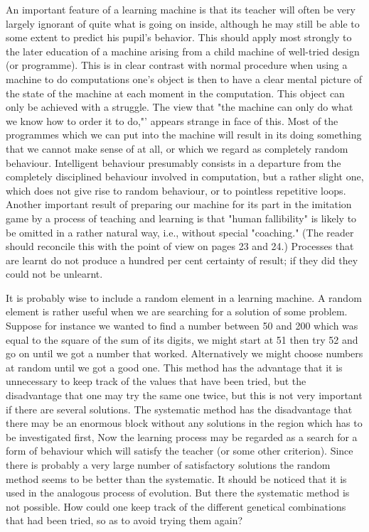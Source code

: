 \documentclass{article}
\begin{document}
An important feature of a learning machine is that its teacher will often be very largely ignorant of quite what is going on inside, although he may still be able to some extent to predict his pupil's behavior. This should apply most strongly to the later education of a machine arising from a child machine of well-tried design (or programme). This is in clear contrast with normal procedure when using a machine to do computations one's object is then to have a clear mental picture of the state of the machine at each moment in the computation. This object can only be achieved with a struggle. The view that "the machine can only do what we know how to order it to do,"' appears strange in face of this. Most of the programmes which we can put into the machine will result in its doing something that we cannot make sense of at all, or which we regard as completely random behaviour. Intelligent behaviour presumably consists in a departure from the completely disciplined behaviour involved in computation, but a rather slight one, which does not give rise to random behaviour, or to pointless repetitive loops. Another important result of preparing our machine for its part in the imitation game by a process of teaching and learning is that "human fallibility" is likely to be omitted in a rather natural way, i.e., without special "coaching." (The reader should reconcile this with the point of view on pages 23 and 24.) Processes that are learnt do not produce a hundred per cent certainty of result; if they did they could not be unlearnt.

It is probably wise to include a random element in a learning machine. A random element is rather useful when we are searching for a solution of some problem. Suppose for instance we wanted to find a number between 50 and 200 which was equal to the square of the sum of its digits, we might start at 51 then try 52 and go on until we got a number that worked. Alternatively we might choose numbers at random until we got a good one. This method has the advantage that it is unnecessary to keep track of the values that have been tried, but the disadvantage that one may try the same one twice, but this is not very important if there are several solutions. The systematic method has the disadvantage that there may be an enormous block without any solutions in the region which has to be investigated first, Now the learning process may be regarded as a search for a form of behaviour which will satisfy the teacher (or some other criterion). Since there is probably a very large number of satisfactory solutions the random method seems to be better than the systematic. It should be noticed that it is used in the analogous process of evolution. But there the systematic method is not possible. How could one keep track of the different genetical combinations that had been tried, so as to avoid trying them again?
\end{document}
